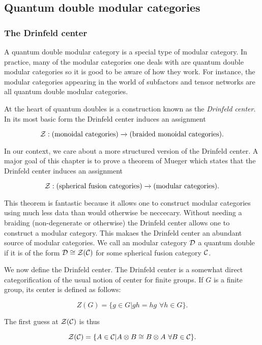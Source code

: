 \subsection{Quantum double modular categories}

\subsubsection{The Drinfeld center}

A quantum double modular category is a special type of modular category. In practice, many of the modular categories one deals with are quantum double modular categories so it is good to be aware of how they work. For instance, the modular categories appearing in the world of subfactors \cite{muger2001subfactorsA, mueger2001subfactorsB} and tensor networks \cite{bultinck2017anyons, dubail2015tensor} are all quantum double modular categories.

At the heart of quantum doubles is a construction known as the {\em Drinfeld center}. In its most basic form the Drinfeld center induces an assignment

$${\mathcal Z}: (\text{monoidal categories})\xrightarrow{}(\text{braided monoidal categories}).$$

In our context, we care about a more structured version of the Drinfeld center. A major goal of this chapter is to prove a theorem of Mueger which states that the Drinfeld center induces an assignment

$${\mathcal Z}: (\text{spherical fusion categories})\xrightarrow{}(\text{modular categories}).$$

This theorem is fantastic because it allows one to construct modular categories using much less data than would otherwise be neccecary. Without needing a braiding (non-degenerate or otherwise) the Drinfeld center allows one to construct a modular category. This makaes the Drinfeld center an abundant source of modular categories. We call an modular category ${\mathcal D}$ a quantum double if it is of the form ${\mathcal D}\cong {\mathcal Z}({\mathcal C})$ for some spherical fusion category ${\mathcal C}$.

We now define the Drinfeld center. The Drinfeld center is a somewhat direct categorification of the usual notion of center for finite groups. If $G$ is a finite group, its center is defined as follows:

$$Z(G)=\{g\in G | gh=hg \,\, \forall h\in G\}.$$

The first guess at ${\mathcal Z}({\mathcal C})$ is thus

$${\mathcal Z}({\mathcal C})=\{A\in {\mathcal C} | A\otimes B \cong B\otimes A \,\, \forall B\in {\mathcal C}\}.$$

